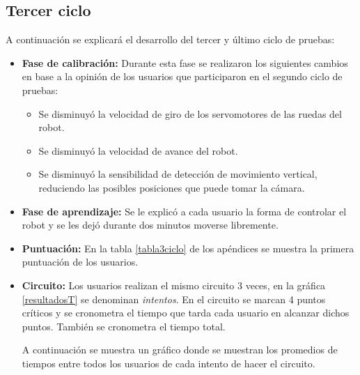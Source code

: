 \documentclass[twoside, 11pt]{epstfg}
\begin{document}
\subsection{Tercer ciclo}

A continuación se explicará el desarrollo del tercer y último ciclo de pruebas:
\begin{itemize}
	\item \textbf{Fase de calibración:} Durante esta fase se realizaron los siguientes cambios en base a la opinión de los usuarios que participaron en el segundo ciclo de pruebas:
	\begin{itemize}
		\item Se disminuyó la velocidad de giro de los servomotores de las ruedas del robot.
		\item Se disminuyó la velocidad de avance del robot.
		\item Se disminuyó la sensibilidad de detección de movimiento vertical, reduciendo las posibles posiciones que puede tomar la cámara.
	\end{itemize}
	\item \textbf{Fase de aprendizaje:} Se le explicó a cada usuario la forma de controlar el robot y se les dejó durante dos minutos moverse libremente.
	\item \textbf{Puntuación: } En la tabla \ref{tabla3ciclo} de los apéndices se muestra la primera puntuación de los usuarios.
	

\item \textbf{Circuito:} Los usuarios realizan el mismo circuito 3 veces, en la gráfica \ref{resultadosT} se denominan \textit{intentos}. En el circuito se marcan 4 puntos críticos y se cronometra el tiempo que tarda cada usuario en alcanzar dichos puntos. También se cronometra el tiempo total.

A continuación se muestra un gráfico donde se muestran los promedios de tiempos entre todos los usuarios de cada intento de hacer el circuito.


\end{itemize}
\end{document}
